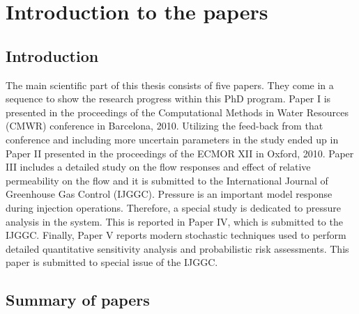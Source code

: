 \chapter{Introduction to the papers}

\pagebreak
\section{Introduction}

The main scientific part of this thesis consists of five papers. They come in a
sequence to show the research progress within this PhD program. Paper I is
presented in the proceedings of the Computational Methods in Water Resources
(CMWR) conference in Barcelona, 2010. Utilizing the feed-back from that
conference and including more uncertain parameters in the study ended up in
Paper II presented in the proceedings of the ECMOR XII in Oxford, 2010. Paper
III includes a detailed study on the flow responses and effect of relative
permeability on the flow and it is submitted to the International Journal of
Greenhouse Gas Control (IJGGC). Pressure is an important model response during
injection operations. Therefore, a special study is dedicated to pressure
analysis in the system. This is reported in Paper IV, which is submitted to the
IJGGC. Finally, Paper V reports modern stochastic techniques used to perform
detailed quantitative sensitivity analysis and probabilistic risk assessments.
This paper is submitted to special issue of the IJGGC.

\section{Summary of papers}

